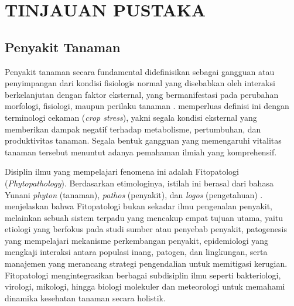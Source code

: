 \chapter{TINJAUAN PUSTAKA}
\section{Penyakit Tanaman}
Penyakit tanaman secara fundamental didefinisikan sebagai gangguan atau penyimpangan dari kondisi fisiologis normal yang disebabkan oleh interaksi berkelanjutan dengan faktor eksternal, yang bermanifestasi pada perubahan morfologi, fisiologi, maupun perilaku tanaman \parencite{vishnoiPlantDiseaseDetection2021}. \textcite{muhammadComprehensiveReviewCrop2025} memperluas definisi ini dengan terminologi cekaman (\textit{crop stress}), yakni segala kondisi eksternal yang memberikan dampak negatif terhadap metabolisme, pertumbuhan, dan produktivitas tanaman. Segala bentuk gangguan yang memengaruhi vitalitas tanaman tersebut menuntut adanya pemahaman ilmiah yang komprehensif.

Disiplin ilmu yang mempelajari fenomena ini adalah Fitopatologi (\textit{Phytopathology}). Berdasarkan etimologinya, istilah ini berasal dari bahasa Yunani \textit{phyton} (tanaman), \textit{pathos} (penyakit), dan \textit{logos} (pengetahuan) \parencite{bhargavaPlantLeafDisease2024}. \citeauthor{bhargavaPlantLeafDisease2024} menjelaskan bahwa Fitopatologi bukan sekadar ilmu pengenalan penyakit, melainkan sebuah sistem terpadu yang mencakup empat tujuan utama, yaitu etiologi yang berfokus pada studi sumber atau penyebab penyakit, patogenesis yang mempelajari mekanisme perkembangan penyakit, epidemiologi yang mengkaji interaksi antara populasi inang, patogen, dan lingkungan, serta manajemen yang merancang strategi pengendalian untuk memitigasi kerugian. Fitopatologi mengintegrasikan berbagai subdisiplin ilmu seperti bakteriologi, virologi, mikologi, hingga biologi molekuler dan meteorologi untuk memahami dinamika kesehatan tanaman secara holistik.

